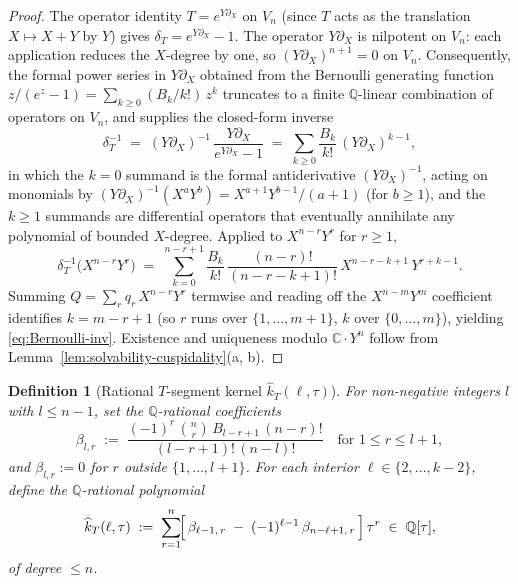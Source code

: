 \documentclass[11pt]{article}
\newtheorem{definition}[theorem]{Definition}
\numberwithin{equation}{section}  %
\newcommand{\QQ}{\mathbb{Q}}
\newcommand{\CC}{\mathbb{C}}
\begin{document}
\begin{proof}
The operator identity $T = e^{Y \partial_X}$ on $V_n$ (since $T$ acts as
the translation $X \mapsto X + Y$ by $Y$) gives
$\delta_T = e^{Y \partial_X} - 1$.  The operator $Y \partial_X$ is
nilpotent on $V_n$: each application reduces the $X$-degree by one, so
$(Y \partial_X)^{n + 1} = 0$ on $V_n$.  Consequently, the formal power
series in $Y \partial_X$ obtained from the Bernoulli generating function
$z/(e^z - 1) = \sum_{k \ge 0}(B_k/k!)\,z^k$ truncates to a finite
$\QQ$-linear combination of operators on $V_n$, and supplies the
closed-form inverse
\begin{equation}\label{eq:delta-T-inverse-operator}
  \delta_T^{-1}
  \;=\; (Y \partial_X)^{-1}\,\frac{Y \partial_X}{e^{Y \partial_X} - 1}
  \;=\; \sum_{k \ge 0}\!\frac{B_k}{k!}\,(Y \partial_X)^{k - 1},
\end{equation}
in which the $k = 0$ summand is the formal antiderivative
$(Y \partial_X)^{-1}$, acting on monomials by
$(Y \partial_X)^{-1}(X^a Y^b) = X^{a + 1} Y^{b - 1}/(a + 1)$ (for $b \ge 1$),
and the $k \ge 1$ summands are differential operators that eventually
annihilate any polynomial of bounded $X$-degree.  Applied to
$X^{n - r} Y^r$ for $r \ge 1$,
\begin{equation}\label{eq:delta-T-inverse-monomial}
  \delta_T^{-1}\bigl(X^{n - r} Y^r\bigr)
  \;=\; \sum_{k = 0}^{n - r + 1}\!\frac{B_k}{k!}\,
        \frac{(n - r)!}{(n - r - k + 1)!}\,X^{n - r - k + 1}\,Y^{r + k - 1}.
\end{equation}
Summing $Q = \sum_r q_r\,X^{n - r} Y^r$ termwise and reading off the
$X^{n - m} Y^m$ coefficient identifies $k = m - r + 1$ (so $r$ runs over
$\{1, \ldots, m + 1\}$, $k$ over $\{0, \ldots, m\}$), yielding
\eqref{eq:Bernoulli-inv}.  Existence and uniqueness modulo
$\CC \cdot Y^n$ follow from Lemma~\ref{lem:solvability-cuspidality}(a, b).
\end{proof}

\begin{definition}[Rational $T$-segment kernel $\widehat{k}_T(\ell, \tau)$]\label{def:khat-T}
For non-negative integers $l$ with $l \le n - 1$, set the
$\QQ$-rational coefficients
\begin{equation}\label{eq:beta-def}
  \beta_{l, r}
  \;:=\; \frac{(-1)^r\,\binom{n}{r}\,B_{l - r + 1}\,(n - r)!}{(l - r + 1)!\,(n - l)!}
  \quad \text{for } 1 \le r \le l + 1,
\end{equation}
and $\beta_{l, r} := 0$ for $r$ outside $\{1, \ldots, l + 1\}$.  For each
interior $\ell \in \{2, \ldots, k - 2\}$, define the $\QQ$-rational
polynomial
\begin{equation}\label{eq:khat-T-def}
  \widehat{k}_T(\ell, \tau)
  \;:=\; \sum_{r = 1}^{n}\!\Bigl[\,\beta_{\ell - 1,\,r} \;-\; (-1)^{\ell - 1}\,\beta_{n - \ell + 1,\,r}\,\Bigr]\,\tau^r
  \;\in\; \QQ[\tau],
\end{equation}
of degree $\le n$.
\end{definition}
\end{document}
